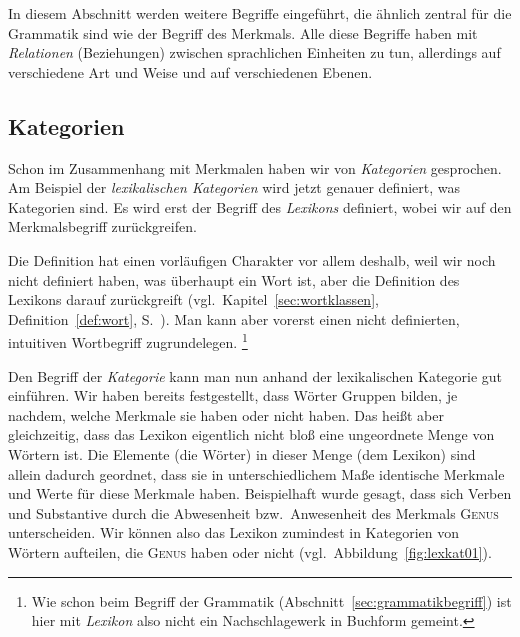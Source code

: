 In diesem Abschnitt werden weitere Begriffe eingeführt, die ähnlich zentral für die Grammatik sind wie der Begriff des Merkmals.
Alle diese Begriffe haben mit \textit{Relationen} (Beziehungen) zwischen sprachlichen Einheiten zu tun, allerdings auf verschiedene Art und Weise und auf verschiedenen Ebenen.

\subsection{Kategorien}

\label{sec:kategorien}


Schon im Zusammenhang mit Merkmalen haben wir von \textit{Kategorien} gesprochen.
Am Beispiel der \textit{lexikalischen Kategorien} wird jetzt genauer definiert, was Kategorien sind.
Es wird erst der Begriff des \textit{Lexikons} definiert, wobei wir auf den Merkmalsbegriff zurückgreifen.


Die Definition hat einen vorläufigen Charakter vor allem deshalb, weil wir noch nicht definiert haben, was überhaupt ein Wort ist, aber die Definition des Lexikons darauf zurückgreift (vgl.\ Kapitel~\ref{sec:wortklassen}, Definition~\ref{def:wort}, S.~\pageref{def:wort}).
Man kann aber vorerst einen nicht definierten, intuitiven Wortbegriff zugrundelegen.%
\footnote{Wie schon beim Begriff der Grammatik (Abschnitt~\ref{sec:grammatikbegriff}) ist hier mit \textit{Lexikon} also nicht ein Nachschlagewerk in Buchform gemeint.}


Den Begriff der \textit{Kategorie} kann man nun anhand der lexikalischen Kategorie gut einführen.
Wir haben bereits festgestellt, dass Wörter Gruppen bilden, je nachdem, welche Merkmale sie haben oder nicht haben.
Das heißt aber gleichzeitig, dass das Lexikon eigentlich nicht bloß eine ungeordnete Menge von Wörtern ist.
Die Elemente (die Wörter) in dieser Menge (dem Lexikon) sind allein dadurch geordnet, dass sie in unterschiedlichem Maße identische Merkmale und Werte für diese Merkmale haben.
Beispielhaft wurde gesagt, dass sich Verben und Substantive durch die Abwesenheit bzw.\ Anwesenheit des Merkmals \textsc{Genus} unterscheiden.
Wir können also das Lexikon zumindest in Kategorien von Wörtern aufteilen, die \textsc{Genus} haben oder nicht (vgl.\ Abbildung~\ref{fig:lexkat01}).

